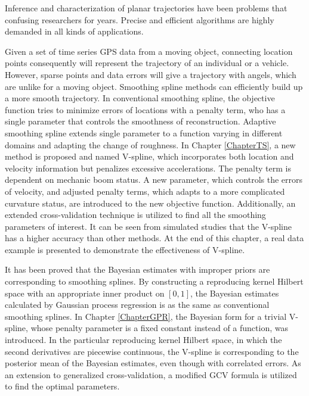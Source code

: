 
Inference and characterization of planar trajectories have been problems that confusing researchers for years. Precise and efficient algorithms are highly demanded in all kinds of applications. 

Given a set of time series GPS data from a moving object, connecting location points consequently will represent the trajectory of an individual or a vehicle. However, sparse points and data errors will give a trajectory with angels, which are unlike for a moving object. Smoothing spline methods can efficiently build up a more smooth trajectory. In conventional smoothing spline, the objective function tries to minimize errors of locations with a penalty term, who has a single parameter that controls the smoothness of reconstruction. Adaptive smoothing spline extends single parameter to a function varying in different domains and adapting the change of roughness. In Chapter \ref{ChapterTS}, a new method is proposed and named V-spline, which incorporates both location and velocity information but penalizes excessive accelerations. The penalty term is dependent on mechanic boom status. A new parameter, which controls the errors of velocity, and adjusted penalty terms, which adapts to a more complicated curvature status, are introduced to the new objective function. Additionally, an extended cross-validation technique is utilized to find all the smoothing parameters of interest. It can be seen from simulated studies that the V-spline has a higher accuracy than other methods. At the end of this chapter, a real data example is presented to demonstrate the effectiveness of V-spline.


It has been proved that the Bayesian estimates with improper priors are corresponding to smoothing splines. By constructing a reproducing kernel Hilbert space with an appropriate inner product on $[0,1]$, the Bayesian estimates calculated by Gaussian process regression is as the same as conventional smoothing splines. In Chapter \ref{ChapterGPR}, the Bayesian form for a trivial V-spline, whose penalty parameter is a fixed constant instead of a function, was introduced. In the particular reproducing kernel Hilbert space, in which the second derivatives are piecewise continuous, the V-spline is corresponding to the posterior mean of the Bayesian estimates, even though with correlated errors. As an extension to generalized cross-validation, a modified GCV formula is utilized to find the optimal parameters. 


